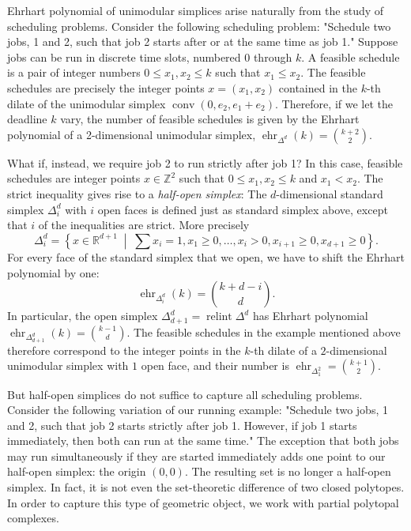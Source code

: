\documentclass[12pt]{amsart}
\newcommand{\RR}{\mathbb{R}}
\newcommand{\ZZ}{\mathbb{Z}}
\newcommand{\ehr}{\operatorname{ehr}}
\newcommand{\conv}{\operatorname{conv}}
\newcommand{\relint}{\operatorname{relint}}
\newcommand{\mset}[2]{ \left\{ #1 \; \middle| \; #2 \right\}}
\begin{document}
Ehrhart polynomial of unimodular simplices arise naturally from the study of scheduling problems. Consider the following scheduling problem: "Schedule two jobs, 1 and 2, such that job 2 starts after or at the same time as job 1." Suppose jobs can be run in discrete time slots, numbered $0$ through $k$. A feasible schedule is a pair of integer numbers $0\leq x_1,x_2 \leq k$ such that $x_1 \leq x_2$. The feasible schedules are precisely the integer points $x=(x_1,x_2)$ contained in the $k$-th dilate of the unimodular simplex $\conv(0,e_2,e_1+e_2)$. Therefore, if we let the deadline $k$ vary, the number of feasible schedules is given by the Ehrhart polynomial of a 2-dimensional unimodular simplex, $\ehr_{\Delta^d}(k)=\binom{k+2}{2}$.

What if, instead, we require job 2 to run strictly after job 1? In this case, feasible schedules are integer points $x\in\ZZ^2$ such that $0\leq x_1,x_2 \leq k$ and $x_1 < x_2$. The strict inequality gives rise to a \emph{half-open simplex}: The $d$-dimensional standard simplex $\Delta^d_i$ with $i$ open faces is defined just as standard simplex above, except that $i$ of the inequalities are strict. More precisely
\[
    \Delta^d_i = \mset{x\in\RR^{d+1}}{\sum x_i =1, x_1 \geq 0, \ldots, x_i > 0, x_{i+1} \geq 0, x_{d+1} \geq 0}.
\]
For every face of the standard simplex that we open, we have to shift the Ehrhart polynomial by one:
\[
  \ehr_{\Delta^d_i}(k) = \binom{k+d-i}{d}.
\]
In particular, the open simplex $\Delta^d_{d+1} = \relint{\Delta^d}$ has Ehrhart polynomial $\ehr_{\Delta^d_{d+1}}(k) = \binom{k-1}{d}$. The feasible schedules in the example mentioned above therefore correspond to the integer points in the $k$-th dilate of a $2$-dimensional unimodular simplex with $1$ open face, and their number is $\ehr_{\Delta^2_1} = \binom{k+1}{2}$.

But half-open simplices do not suffice to capture all scheduling problems. Consider the following variation of our running example: "Schedule two jobs, 1 and 2, such that job 2 starts strictly after job 1. However, if job 1 starts immediately, then both can run at the same time." The exception that both jobs may run simultaneously if they are started immediately adds one point to our half-open simplex: the origin $(0,0)$. The resulting set is no longer a half-open simplex. In fact, it is not even the set-theoretic difference of two closed polytopes. In order to capture this type of geometric object, we work with partial polytopal complexes.
\end{document}
